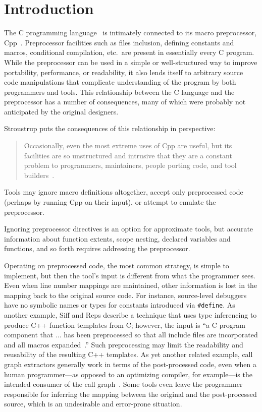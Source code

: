 \bigskip

\section{Introduction}

The C programming language~\cite{ansi} is intimately connected to its macro
preprocessor, Cpp~\cite[Ch.3]{Harbison91}.  Preprocessor facilities such as
files inclusion, defining constants and macros, conditional compilation,
etc.\ are present in essentially every C program.  
While the preprocessor can be used in a simple or well-structured way to
improve portability, performance, or readability, it also lends itself to 
arbitrary source code manipulations that complicate understanding of the
program by both programmers and tools.
This relationship
between the C language and the preprocessor has a number of consequences,
many of which were probably not anticipated by the original designers.

Stroustrup puts the consequences of this relationship in perspective:
\begin{quote}
Occasionally, even the most extreme uses of Cpp are useful, but its
facilities are so unstructured and intrusive that they are a constant
problem to programmers, maintainers, people porting code, and tool
builders~\cite[p.~424]{Stroustrup-DesignEvolution}.
\end{quote}

Tools may ignore macro definitions altogether, accept only preprocessed
code (perhaps by running Cpp on their input), or attempt to emulate the
preprocessor.

Ignoring preprocessor directives is an option for approximate tools, but
accurate information about function extents, scope nesting, declared
variables and functions, and so forth requires addressing the preprocessor.

Operating on preprocessed code, the most common strategy, is simple to
implement, but then the tool's input is different from what the
programmer sees.  Even when line number mappings are maintained, other
information is lost in the mapping back to the original source code.
For instance, source-level debuggers have no symbolic names or types
for constants introduced via \verb|#define|.  As another example, Siff
and Reps describe a technique that uses type inferencing to produce
C++ function templates from C; however, the input is ``a C program
component that $\ldots$ has been preprocessed so that all include
files are incorporated and all macros
expanded~\cite[p.~145]{Siff-fse96}.''  Such preprocessing may limit
the readability and reusability of the resulting C++ templates.  As
yet another related example, call graph extractors generally work in
terms of the post-processed code, even when a human programmer---as
opposed to an optimizing compiler, for example---is the intended
consumer of the call graph~\cite{Murphy-icse18}.  Some tools even
leave the programmer responsible for inferring the mapping between the
original and the post-processed source, which is an undesirable and
error-prone situation.

